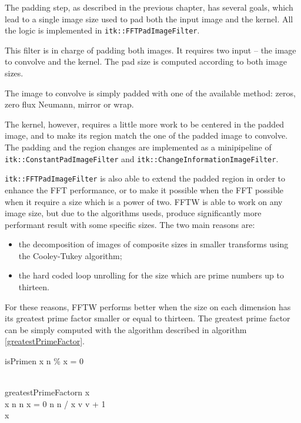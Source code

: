 \documentclass{InsightArticle}
\begin{document}
The padding step, as described in the previous chapter, has several goals, which lead to a single
image size used to pad both the input image and the kernel.
All the logic is implemented in \verb$itk::FFTPadImageFilter$.

This filter is in charge of padding both images. It requires two input -- the image to convolve and
the kernel. The pad size is computed according to both image sizes.

The image to convolve is simply padded with one of the available method: zeros, zero flux Neumann, mirror
or wrap.

The kernel, however, requires a little more work to be
centered in the padded image, and to make its region match the one of the padded image to convolve.
The padding and the region changes are implemented as a minipipeline of \verb$itk::ConstantPadImageFilter$ and
\verb$itk::ChangeInformationImageFilter$.

\verb$itk::FFTPadImageFilter$ is also able to extend the padded region in order to enhance the FFT
performance, or to make it possible when the FFT possible when it require a size which is a power of
two. FFTW is able to work on any image size, but due to the algorithms useds, produce significantly
more performant result with some specific sizes. The two main reasons are:
\begin{itemize}
  \item the decomposition of images of composite sizes in smaller transforms using the
  Cooley-Tukey algorithm;
  \item the hard coded loop unrolling for the size which are prime numbers up to thirteen.
\end{itemize}
For these reasons, FFTW performs better when the size on each dimension has its greatest prime
factor smaller or equal to thirteen.
The greatest prime factor can be simply computed with the algorithm described in algorithm \ref{greatestPrimeFactor}.

\begin{pseudocode}{isPrime}{n}
\FOREACH x \in [2, \sqrt{n}] \DO 
\BEGIN
  \IF n \% x = 0 \THEN \RETURN \FALSE \\
\END \\
\RETURN \TRUE
\end{pseudocode}

\begin{pseudocode}{greatestPrimeFactor}{n}
\label{greatestPrimeFactor}
x  \\
\WHILE x \leq n \DO
\BEGIN
  \IF n \bmod x = 0 \AND {}
  \THEN
    n \GETS n / x
  \ELSE
    v \GETS v + 1
\END \\
\RETURN x
\end{pseudocode}
\end{document}

